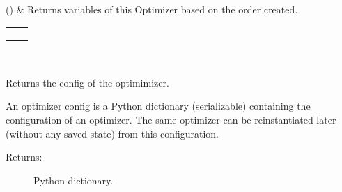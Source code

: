 \documentclass[letterpaper,10pt,english]{sphinxmanual}
\begin{document}
\begin{fulllineitems}
\begin{savenotes}
\begin{longtable}[c]{}
\\
\hline
{}()
&
Returns variables of this Optimizer based on the order created.
\\
\hline
\end{longtable}\sphinxatlongtableend\end{savenotes}


\begin{savenotes}\sphinxattablestart
\centering
\begin{tabulary}{\linewidth}[t]{|T|T|}
\hline

&\\
\hline
{}
&\\
\hline
{}
&\\
\hline
{}
&\\
\hline
\end{tabulary}
\par
\sphinxattableend\end{savenotes}

\begin{fulllineitems}
\label{\detokenize{utils/adabound:utils.adabound.AdaBound.get_updates}}~
\end{fulllineitems}


\begin{fulllineitems}
\label{\detokenize{utils/adabound:utils.adabound.AdaBound.get_config}}
Returns the config of the optimimizer.

An optimizer config is a Python dictionary (serializable)
containing the configuration of an optimizer.
The same optimizer can be reinstantiated later
(without any saved state) from this configuration.
\begin{description}
\item[{Returns:}] \leavevmode
Python dictionary.

\end{description}

\end{fulllineitems}


\end{fulllineitems}
\end{document}
